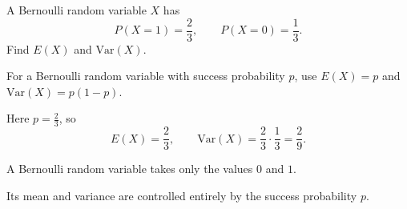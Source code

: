 \begin{problem}
A Bernoulli random variable $X$ has
\[
P(X=1)=\frac23,
\qquad
P(X=0)=\frac13.
\]
Find $E(X)$ and $\mathrm{Var}(X)$.
\end{problem}

\begin{hint}
For a Bernoulli random variable with success probability $p$, use $E(X)=p$ and $\mathrm{Var}(X)=p(1-p)$.
\end{hint}

\begin{solution}
Here $p=\frac23$, so
\[
E(X)=\frac23,
\qquad
\mathrm{Var}(X)=\frac23\cdot \frac13=\frac29.
\]
\end{solution}

\begin{takeaways}
\item A Bernoulli random variable takes only the values $0$ and $1$.
\item Its mean and variance are controlled entirely by the success probability $p$.
\end{takeaways}
